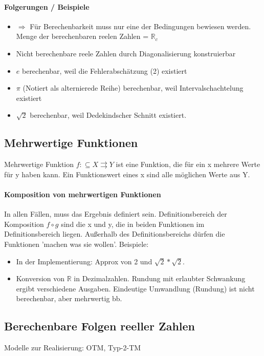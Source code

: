 \documentclass[ngerman]{scrartcl}
\begin{document}
 \paragraph{Folgerungen / Beispiele}
\begin{itemize}
  \item $ \Rightarrow $ Für Berechenbarkeit muss nur eine der Bedingungen bewiesen werden. Menge der berechenbaren reelen Zahlen = $ \mathbb{R}_c $
  \item Nicht berechenbare reele Zahlen durch Diagonalisierung konstruierbar
  \item $ e $ berechenbar, weil die Fehlerabschätzung (2) existiert
  \item $ \pi $ (Notiert als alternierede Reihe) berechenbar, weil Intervalschachtelung existiert
  \item $ \sqrt{2} $ berechenbar, weil Dedekindscher Schnitt existiert.
 \end{itemize}

\subsection{Mehrwertige Funktionen}
Mehrwertige Funktion $ f: \subseteq X \rightrightarrows  Y $ ist eine Funktion, die für ein x mehrere Werte für y haben kann. Ein Funktionswert eines x sind alle möglichen Werte aus Y.

\paragraph{Komposition von mehrwertigen Funktionen} In allen Fällen, muss das Ergebnis definiert sein. Definitionsbereich  der Komposition $ f \circ g $ sind die x und y, die in beiden Funktionen im Definitionsbereich liegen. Außerhalb des Definitionsbereichs dürfen die Funktionen 'machen was sie wollen'. Beispiele:
\begin{itemize}
  \item In der Implementierung: Approx von 2 und $ \sqrt{2} * \sqrt{2} $.
  \item Konversion von $ \mathbb{R} $ in Dezimalzahlen. Rundung mit erlaubter Schwankung ergibt verschiedene Ausgaben. Eindeutige Umwandlung (Rundung) ist nicht berechenbar, aber mehrwertig bb.
\end{itemize}

\subsection{Berechenbare Folgen reeller Zahlen}
Modelle zur Realisierung: OTM, Typ-2-TM
\end{document}
